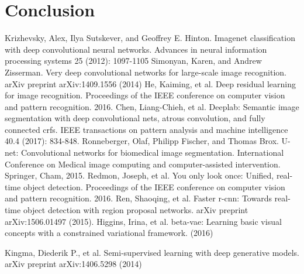 \documentclass[runningheads]{llncs}
\begin{document}
\section{Conclusion}
%
%
%


%
\begin{thebibliography}{8}
    Krizhevsky, Alex, Ilya Sutskever, and Geoffrey E. Hinton. Imagenet classification with deep convolutional neural networks. Advances in neural information processing systems 25 (2012): 1097-1105
    Simonyan, Karen, and Andrew Zisserman. Very deep convolutional networks for large-scale image recognition. arXiv preprint arXiv:1409.1556 (2014)
    He, Kaiming, et al. Deep residual learning for image recognition. Proceedings of the IEEE conference on computer vision and pattern recognition. 2016.
    Chen, Liang-Chieh, et al. Deeplab: Semantic image segmentation with deep convolutional nets, atrous convolution, and fully connected crfs. IEEE transactions on pattern analysis and machine intelligence 40.4 (2017): 834-848.
    Ronneberger, Olaf, Philipp Fischer, and Thomas Brox. U-net: Convolutional networks for biomedical image segmentation. International Conference on Medical image computing and computer-assisted intervention. Springer, Cham, 2015.
    Redmon, Joseph, et al. You only look once: Unified, real-time object detection. Proceedings of the IEEE conference on computer vision and pattern recognition. 2016.
    Ren, Shaoqing, et al. Faster r-cnn: Towards real-time object detection with region proposal networks. arXiv preprint arXiv:1506.01497 (2015).
    Higgins, Irina, et al. beta-vae: Learning basic visual concepts with a constrained variational framework. (2016)

    Kingma, Diederik P., et al. Semi-supervised learning with deep generative models. arXiv preprint arXiv:1406.5298 (2014)


\end{thebibliography}
\end{document}

